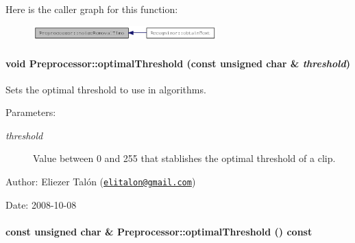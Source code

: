 Here is the caller graph for this function:\nopagebreak
\begin{figure}[H]
\begin{center}
\leavevmode
\includegraphics[width=201pt]{class_preprocessor_ff8eee937760e42c0c2bea307849ada1_icgraph}
\end{center}
\end{figure}
\hypertarget{class_preprocessor_1fc44d7d19944f3c3addd3a576c37414}{
\paragraph[{optimalThreshold}]{\setlength{\rightskip}{0pt plus 5cm}void Preprocessor::optimalThreshold (const unsigned char \& {\em threshold})}\hfill}
\label{class_preprocessor_1fc44d7d19944f3c3addd3a576c37414}


Sets the optimal threshold to use in algorithms. 

\begin{Desc}
\item[Parameters:]
\begin{description}
\item[{\em threshold}]Value between 0 and 255 that stablishes the optimal threshold of a clip.\end{description}
\end{Desc}
\begin{Desc}
\item[Author:]Eliezer Talón (\href{mailto:elitalon@gmail.com}{\tt elitalon@gmail.com}) \end{Desc}
\begin{Desc}
\item[Date:]2008-10-08 \end{Desc}
\hypertarget{class_preprocessor_a44dff024a5b29752780bd4aa0d53d81}{
\paragraph[{optimalThreshold}]{\setlength{\rightskip}{0pt plus 5cm}const unsigned char \& Preprocessor::optimalThreshold () const}\hfill}
\label{class_preprocessor_a44dff024a5b29752780bd4aa0d53d81}


